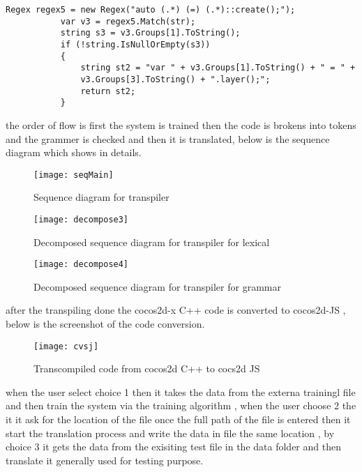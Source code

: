 \documentclass[23pt]{article}
\begin{document}
\begin{lstlisting}[label=some-code,caption= Example of peg grammar]
Regex regex5 = new Regex("auto (.*) (=) (.*)::create();");
           var v3 = regex5.Match(str);
           string s3 = v3.Groups[1].ToString();
           if (!string.IsNullOrEmpty(s3))
           {
               string st2 = "var " + v3.Groups[1].ToString() + " = " +
               v3.Groups[3].ToString() + ".layer();";
               return st2;
           }
\end{lstlisting}
{\Large     \par}



\newpage

{\Large the order of flow is first the system is trained then the code is brokens into tokens and the grammer is checked and then it is translated, below is the sequence diagram which shows in details. \par}

\begin{figure}[h]
\caption{Sequence diagram for transpiler}
\centering
\texttt{[image: seqMain]}
\end{figure}

\newpage

\begin{figure}[h]
\caption{Decomposed sequence diagram for transpiler for lexical}
\centering
\texttt{[image: decompose3]}
\end{figure}

\begin{figure}[h]
\caption{Decomposed sequence diagram for transpiler for grammar}
\centering
\texttt{[image: decompose4]}
\end{figure}

{\Large after the transpiling done the cocos2d-x C++ code is converted to cocos2d-JS , below is the screenshot of the code conversion. \par}
\begin{figure}[h]
\caption{Transcompiled code from cocos2d C++ to cocs2d JS}
\centering
\texttt{[image: cvsj]}
\end{figure}

{\Large when the user select choice 1 then it takes the data from the externa trainingl file and then train the system via the training algorithm , when the user choose 2 the it it ask for the location of the file once the full path of the file is entered then it start the translation process and write the data in file the same location , by choice 3 it gets the data from the exisiting test file in the data folder and then translate it generally used for testing purpose. \\ \\ \par}
\end{document}
